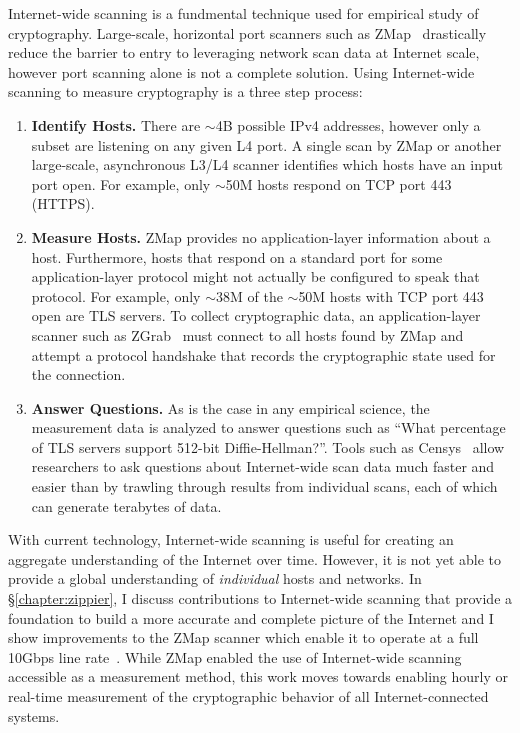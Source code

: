 Internet-wide scanning is a fundmental technique used for empirical study of
cryptography. Large-scale, horizontal port scanners such as
ZMap~\cite{zmap-2013} drastically reduce the barrier to entry to leveraging
network scan data at Internet scale, however port scanning alone is not a
complete solution. Using Internet-wide scanning to measure cryptography is a
three step process:
\begin{enumerate}
  \item \textbf{Identify Hosts.}
    There are $\sim$4B possible IPv4 addresses, however only a subset are
    listening on any given L4 port. A single scan by ZMap or another
    large-scale, asynchronous L3/L4 scanner identifies which hosts have an
    input port open. For example, only $\sim$50M hosts respond on TCP port 443
    (HTTPS).
  \item \textbf{Measure Hosts.}
    ZMap provides no application-layer information about a host. Furthermore,
    hosts that respond on a standard port for some application-layer protocol
    might not actually be configured to speak that protocol. For example,
    only $\sim$38M of the $\sim$50M hosts with TCP port 443 open are TLS
    servers. To collect cryptographic data, an application-layer scanner such
    as ZGrab~\cite{zgrab-github} must connect to all hosts found by ZMap and
    attempt a protocol handshake that records the cryptographic state used
    for the connection.
  \item \textbf{Answer Questions.}
    As is the case in any empirical science, the measurement data is analyzed
    to answer questions such as ``What percentage of TLS servers support
    512-bit Diffie-Hellman?''. Tools such as Censys~\cite{censys} allow
    researchers to ask questions about Internet-wide scan data much faster
    and easier than by trawling through results from individual scans, each
    of which can generate terabytes of data.
\end{enumerate}

With current technology, Internet-wide scanning is useful for creating an
aggregate understanding of the Internet over time. However, it is not yet
able to provide a global understanding of \textit{individual} hosts and
networks. In \S\ref{chapter:zippier}, I discuss contributions to
Internet-wide scanning that provide a foundation to build a more accurate and
complete picture of the Internet and I show improvements to the ZMap scanner
which enable it to operate at a full 10Gbps line
rate~\cite{zippier-zmap-2014}. While ZMap enabled the use of Internet-wide
scanning accessible as a measurement method, this work moves towards enabling
hourly or real-time measurement of the cryptographic behavior of all
Internet-connected systems.

